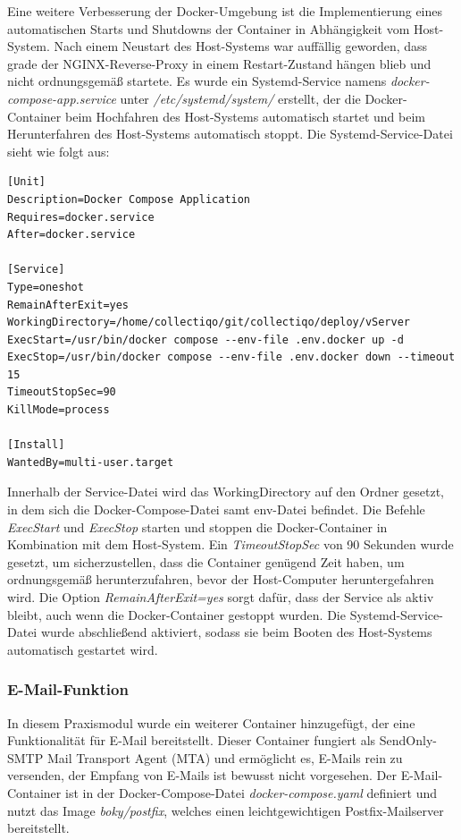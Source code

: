 Eine weitere Verbesserung der Docker-Umgebung ist die Implementierung eines automatischen Starts und Shutdowns der Container in Abhängigkeit vom Host-System.
Nach einem Neustart des Host-Systems war auffällig geworden, dass grade der NGINX-Reverse-Proxy in einem Restart-Zustand hängen blieb und nicht ordnungsgemäß startete.
Es wurde ein Systemd-Service  namens \textit{docker-compose-app.service} unter \textit{/etc/systemd/system/} erstellt, der die Docker-Container beim Hochfahren des Host-Systems automatisch startet und beim Herunterfahren des Host-Systems automatisch stoppt.
Die Systemd-Service-Datei sieht wie folgt aus:
\vspace{1em}
\begin{lstlisting}[label={lst:lst-systemd-service}, caption=Systemd-Service-Datei für Docker-Compose]
[Unit]
Description=Docker Compose Application
Requires=docker.service
After=docker.service

[Service]
Type=oneshot
RemainAfterExit=yes
WorkingDirectory=/home/collectiqo/git/collectiqo/deploy/vServer
ExecStart=/usr/bin/docker compose --env-file .env.docker up -d
ExecStop=/usr/bin/docker compose --env-file .env.docker down --timeout 15
TimeoutStopSec=90
KillMode=process

[Install]
WantedBy=multi-user.target
\end{lstlisting}
\vspace{1em}

Innerhalb der Service-Datei wird das WorkingDirectory auf den Ordner gesetzt, in dem sich die Docker-Compose-Datei samt env-Datei befindet.
Die Befehle \textit{ExecStart} und \textit{ExecStop} starten und stoppen die Docker-Container in Kombination mit dem Host-System.
Ein \textit{TimeoutStopSec} von 90 Sekunden wurde gesetzt, um sicherzustellen, dass die Container genügend Zeit haben, um ordnungsgemäß herunterzufahren, bevor der Host-Computer heruntergefahren wird.
Die Option \textit{RemainAfterExit=yes} sorgt dafür, dass der Service als aktiv bleibt, auch wenn die Docker-Container gestoppt wurden.
Die Systemd-Service-Datei wurde abschließend aktiviert, sodass sie beim Booten des Host-Systems automatisch gestartet wird.


\subsubsection{E-Mail-Funktion}\label{subsubsec:vserver-docker-email}

In diesem Praxismodul wurde ein weiterer Container hinzugefügt, der eine Funktionalität für E-Mail bereitstellt.
Dieser Container fungiert als SendOnly-SMTP Mail Transport Agent (MTA) und ermöglicht es, E-Mails rein zu versenden, der Empfang von E-Mails ist bewusst nicht vorgesehen.
Der E-Mail-Container ist in der Docker-Compose-Datei \textit{docker-compose.yaml} definiert und nutzt das Image \textit{boky/postfix}, welches einen leichtgewichtigen Postfix-Mailserver bereitstellt.

